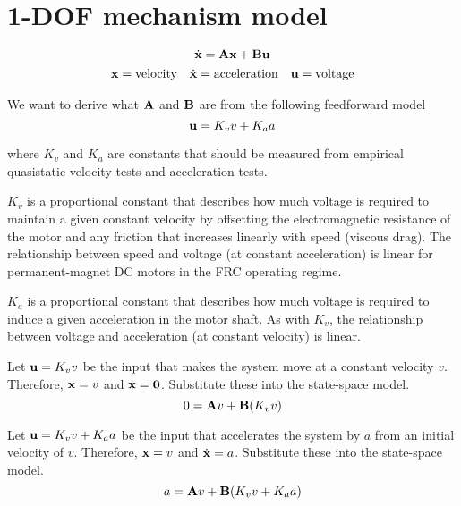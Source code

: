\section{1-DOF mechanism model}
\begin{equation*}
  \dot{\mathbf{x}} = \mathbf{A}\mathbf{x} + \mathbf{B}\mathbf{u}
\end{equation*}
\begin{equation*}
  \begin{array}{ccc}
    \mathbf{x} = \text{velocity} & \dot{\mathbf{x}} = \text{acceleration} &
      \mathbf{u} = \text{voltage}
  \end{array}
\end{equation*}

We want to derive what $\mathbf{A}$ and $\mathbf{B}$ are from the following
feedforward model
\begin{equation*}
  \mathbf{u} = K_v v + K_a a
\end{equation*}

where $K_v$ and $K_a$ are constants that should be measured from empirical
quasistatic velocity tests and acceleration tests.

$K_v$ is a proportional constant that describes how much voltage is required to
maintain a given constant velocity by offsetting the electromagnetic resistance
of the motor and any friction that increases linearly with speed (viscous drag).
The relationship between speed and voltage (at constant acceleration) is linear
for permanent-magnet DC motors in the FRC operating regime.

$K_a$ is a proportional constant that describes how much voltage is required to
induce a given acceleration in the motor shaft. As with $K_v$, the relationship
between voltage and acceleration (at constant velocity) is linear.

Let $\mathbf{u} = K_v v$ be the input that makes the system move at a constant
velocity $v$. Therefore, $\mathbf{x} = v$ and $\dot{\mathbf{x}} = \mathbf{0}$. Substitute
these into the state-space model.
\begin{equation}
  0 = \mathbf{A}v + \mathbf{B}(K_v v) \label{eq:sysid-eq1}
\end{equation}

Let $\mathbf{u} = K_v v + K_a a$ be the input that accelerates the system by $a$
from an initial velocity of $v$. Therefore, $\mathbf{x} = v$ and
$\dot{\mathbf{x}} = a$. Substitute these into the state-space model.
\begin{equation}
  a = \mathbf{A}v + \mathbf{B}(K_v v + K_a a) \label{eq:sysid-eq2}
\end{equation}

